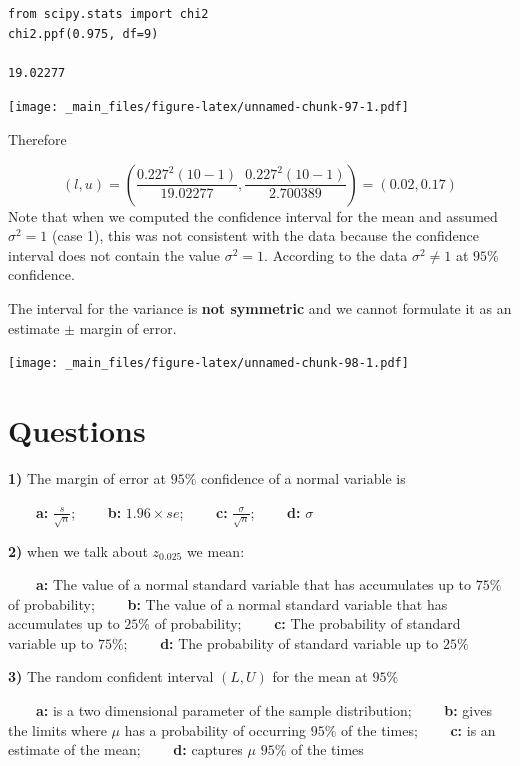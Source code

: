 \documentclass[
]{book}
\begin{document}
\begin{verbatim}
from scipy.stats import chi2
chi2.ppf(0.975, df=9)

19.02277
\end{verbatim}

\texttt{[image: \_main\_files/figure-latex/unnamed-chunk-97-1.pdf]}

Therefore

\[(l,u)= (\frac{0.227^2 (10-1)}{19.02277},\frac{0.227^2(10-1)}{2.700389})=(0.02,0.17)\]
Note that when we computed the confidence interval for the mean and assumed \(\sigma^2=1\) (case 1), this was not consistent with the data because the confidence interval does not contain the value \(\sigma^2=1\).
According to the data \(\sigma^2 \neq 1\) at \(95\%\) confidence.

The interval for the variance is \textbf{not symmetric} and we cannot formulate it as an estimate \(\pm\) margin of error.

\texttt{[image: \_main\_files/figure-latex/unnamed-chunk-98-1.pdf]}

\hypertarget{questions-10}{%
\section{Questions}\label{questions-10}}

\textbf{1)} The margin of error at \(95\%\) confidence of a normal variable is

\textbf{\(\qquad\)a:} \(\frac{s}{\sqrt{n}}\);
\textbf{\(\qquad\)b:} \(1.96\times se\);
\textbf{\(\qquad\)c:} \(\frac{\sigma}{\sqrt{n}}\);
\textbf{\(\qquad\)d:} \(\sigma\)

\textbf{2)} when we talk about \(z_{0.025}\) we mean:

\textbf{\(\qquad\)a:} The value of a normal standard variable that has accumulates up to \(75\%\) of probability;
\textbf{\(\qquad\)b:} The value of a normal standard variable that has accumulates up to \(25\%\) of probability;
\textbf{\(\qquad\)c:} The probability of standard variable up to \(75\%\);
\textbf{\(\qquad\)d:} The probability of standard variable up to \(25\%\)

\textbf{3)} The random confident interval \((L,U)\) for the mean at \(95\%\)

\textbf{\(\qquad\)a:} is a two dimensional parameter of the sample distribution;
\textbf{\(\qquad\)b:} gives the limits where \(\mu\) has a probability of occurring \(95\%\) of the times;
\textbf{\(\qquad\)c:} is an estimate of the mean;
\textbf{\(\qquad\)d:} captures \(\mu\) \(95\%\) of the times
\end{document}
